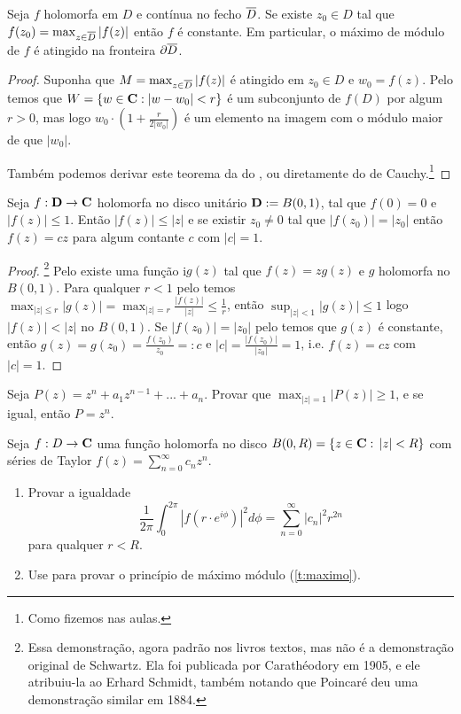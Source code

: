 \begin{teorema}
\label{t:maximo}
Seja $f$ holomorfa em $D$ e contínua no fecho $\overline{D}$.
Se existe $z_0\in D$ tal que $f(z_0) = \max_{z\in\overline{D}} |f(z)|$ então $f$ é constante.
Em particular, o máximo de módulo de $f$ é atingido na fronteira $\partial\overline{D}$.
\end{teorema}
\begin{proof}
Suponha que $M = \max_{z\in\overline{D}} |f(z)|$ é atingido em $z_0\in D$ e $w_0 = f(z)$.
Pelo  temos que $W = \{ w\in\mathbf{C} : |w-w_0|<r \}$
é um subconjunto de $f(D)$ por algum $r>0$, mas logo
$w_0 \cdot (1+\frac{r}{2|w_0|})$ é um elemento na imagem com o módulo maior
de que $|w_0|$.

Também podemos derivar este teorema da  do ,
ou diretamente do  de Cauchy.\footnote{Como fizemos nas aulas.}
\end{proof}


\begin{lema}[Schwartz, 1869]
Seja $f : \mathbf{D} \to \mathbf{C}$ holomorfa no disco unitário $\mathbf{D} := B(0,1)$,
tal que $f(0) = 0$ e $|f(z)| \leq 1$. Então $|f(z)|\leq|z|$
e se existir $z_0\neq 0$ tal que $|f(z_0)| = |z_0|$ então $f(z) = c z$ para algum contante $c$ com
$|c|=1$.
\end{lema}
\begin{proof}\footnote{Essa demonstração, agora padrão nos livros textos,
mas não é a demonstração original de Schwartz.
Ela foi publicada por Carathéodory em 1905,
e ele atribuiu-la ao Erhard Schmidt, também notando que Poincaré deu
uma demonstração similar em 1884.}
Pelo  existe uma função i$g(z)$ tal que $f(z) = z g(z)$ e $g$ holomorfa no $B(0,1)$.
Para qualquer $r<1$ pelo  temos
$\max_{|z|\leq r} |g(z)| = \max_{|z|=r} \frac{|f(z)|}{|z|} \leq \frac1{r}$,
então $\sup_{|z|<1} |g(z)|\leq 1$ logo $|f(z)|<|z|$ no $B(0,1)$.
Se $|f(z_0)| = |z_0|$ pelo  temos que $g(z)$ é constante,
então $g(z) = g(z_0) = \frac{f(z_0)}{z_0} =:c$ e $|c| = \frac{|f(z_0)|}{|z_0|} = 1$,
i.e. $f(z) = c z$ com $|c|=1$.
\end{proof}


\begin{problema}
Seja $P(z) = z^n + a_1 z^{n-1} + ... + a_n$.
Provar que $\max_{|z|=1} |P(z)| \geq 1$,
e se igual, então $P = z^n$.
\end{problema}

\begin{problema}
\label{p:l2}
Seja $f : D \to \mathbf{C}$ uma função holomorfa no disco $B(0,R) = \{z\in\mathbf{C}:\, |z|<R \}$
com séries de Taylor $f(z) = \sum_{n=0}^\infty c_n z^n$.
\begin{enumerate}
\item Provar a igualdade
\begin{equation}
\label{eq:l2}
\frac{1}{2\pi} \int_0^{2\pi} |f(r\cdot e^{i\phi})|^2 d\phi = \sum_{n=0}^\infty |c_n|^2 r^{2n} 
\end{equation}
 para qualquer $r < R$.
\item Use  para provar o princípio de máximo módulo (\cref{t:maximo}).
\end{enumerate}
\end{problema}

